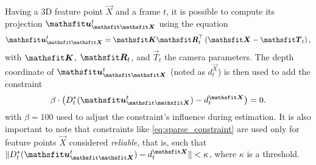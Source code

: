 {{ 	Having a 3D feature point $\vec X$ and a frame $t$, it is possible to compute its projection $\ProjectedFeature{t}{\vec X}$ using the equation
 	$$
 	\ProjectedFeature{t}{\vec X} = \mat{K}\Transpose{\mat{R}_t}\left(\vec X - \vec{T}_t\right),
 	$$
 	with $\mat{K}$, $\mat{R}_t$, and $\vec T_t$ the camera parameters.
 	The depth coordinate of $\ProjectedFeature{t}{\vec X}$ (noted as $d^{\vec X}_t$) is then used to add the constraint
 	\begin{equation}\label{eq:sparse_constraint}
 		\beta\cdot\left(D^*_t(\ProjectedFeature{t}{\vec X}) - d_t^{\vec X}\right) = 0.
 	\end{equation}
 	with $\beta=100$ used to adjust the constraint's influence during estimation. 
 	It is also important to note that constraints like \cref{eq:sparse_constraint} are used only for feature points $\vec X$ considered \emph{reliable}, that is, such that 
 	$\lVert D^*_t(\ProjectedFeature{t}{\vec X}) - d_t^{\vec X} \rVert < \kappa$, where $\kappa$ is a threshold.
 	}
}


